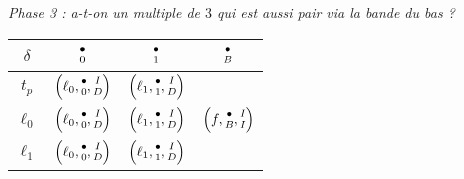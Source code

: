 \begin{center}
	\emph{\small Phase 3 : a-t-on un multiple de $3$ qui est aussi pair via la bande du bas ?}
	
	\smallskip
	\renewcommand{\arraystretch}{1.25}
	\begin{tabular}{|c||c|c|c|}
		\hline
		$\delta$ 
			& ${\scriptsize\begin{matrix}\bullet\\0\end{matrix}}$ 
			& ${\scriptsize\begin{matrix}\bullet\\1\end{matrix}}$ 
			& ${\scriptsize\begin{matrix}\bullet\\B\end{matrix}}$  \\
		\hline
		\hline
		$t_p$
			& $\left( \ell_0 , {\scriptsize\begin{matrix}\bullet\\0\end{matrix}} , {\scriptsize\begin{matrix}I\\D\end{matrix}} \right)$
			& $\left( \ell_1 , {\scriptsize\begin{matrix}\bullet\\1\end{matrix}} , {\scriptsize\begin{matrix}I\\D\end{matrix}} \right)$
			&                                                                   \\
		\hline
		\hline
		$\ell_0$
			& $\left( \ell_0 , {\scriptsize\begin{matrix}\bullet\\0\end{matrix}} , {\scriptsize\begin{matrix}I\\D\end{matrix}} \right)$
			& $\left( \ell_1 , {\scriptsize\begin{matrix}\bullet\\1\end{matrix}} , {\scriptsize\begin{matrix}I\\D\end{matrix}} \right)$
			& $\left( f      , {\scriptsize\begin{matrix}\bullet\\B\end{matrix}} , {\scriptsize\begin{matrix}I\\I\end{matrix}} \right)$ \\
		\hline
		$\ell_1$
			& $\left( \ell_0 , {\scriptsize\begin{matrix}\bullet\\0\end{matrix}} , {\scriptsize\begin{matrix}I\\D\end{matrix}} \right)$
			& $\left( \ell_1 , {\scriptsize\begin{matrix}\bullet\\1\end{matrix}} , {\scriptsize\begin{matrix}I\\D\end{matrix}} \right)$
			&                                                                   \\
		\hline
	\end{tabular}
	\renewcommand{\arraystretch}{1}
\end{center}